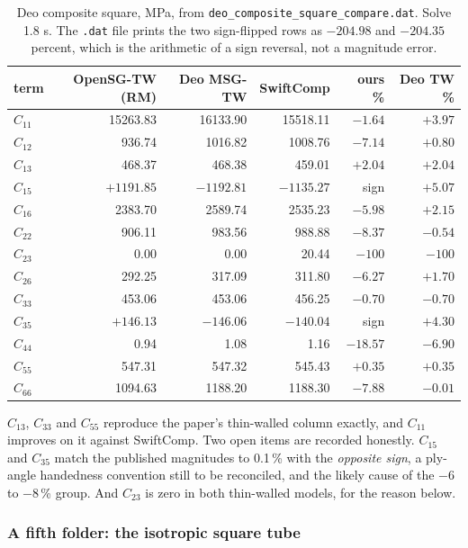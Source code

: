 \begin{table}[htbp]
\centering
\small
\begin{tabular}{lrrrrr}
\toprule
term & OpenSG-TW (RM) & Deo MSG-TW & SwiftComp & ours \% & Deo TW \% \\
\midrule
$C_{11}$ & 15263.83 & 16133.90 & 15518.11 & $-1.64$ & $+3.97$ \\
$C_{12}$ &   936.74 &  1016.82 &  1008.76 & $-7.14$ & $+0.80$ \\
$C_{13}$ &   468.37 &   468.38 &   459.01 & $+2.04$ & $+2.04$ \\
$C_{15}$ & $+1191.85$ & $-1192.81$ & $-1135.27$ & sign & $+5.07$ \\
$C_{16}$ &  2383.70 &  2589.74 &  2535.23 & $-5.98$ & $+2.15$ \\
$C_{22}$ &   906.11 &   983.56 &   988.88 & $-8.37$ & $-0.54$ \\
$C_{23}$ &     0.00 &     0.00 &    20.44 & $-100$ & $-100$ \\
$C_{26}$ &   292.25 &   317.09 &   311.80 & $-6.27$ & $+1.70$ \\
$C_{33}$ &   453.06 &   453.06 &   456.25 & $-0.70$ & $-0.70$ \\
$C_{35}$ & $+146.13$ & $-146.06$ & $-140.04$ & sign & $+4.30$ \\
$C_{44}$ &     0.94 &     1.08 &     1.16 & $-18.57$ & $-6.90$ \\
$C_{55}$ &   547.31 &   547.32 &   545.43 & $+0.35$ & $+0.35$ \\
$C_{66}$ &  1094.63 &  1188.20 &  1188.30 & $-7.88$ & $-0.01$ \\
\bottomrule
\end{tabular}
\caption{Deo composite square, MPa, from
\texttt{deo\_composite\_square\_compare.dat}. Solve 1.8 s. The \texttt{.dat} file
prints the two sign-flipped rows as $-204.98$ and $-204.35$ percent, which is the
arithmetic of a sign reversal, not a magnitude error.}
\label{tab:deo-comp}
\end{table}

$C_{13}$, $C_{33}$ and $C_{55}$ reproduce the paper's thin-walled column exactly,
and $C_{11}$ improves on it against SwiftComp. Two open items are recorded
honestly. $C_{15}$ and $C_{35}$ match the published magnitudes to 0.1\,\% with
the \emph{opposite sign}, a ply-angle handedness convention still to be
reconciled, and the likely cause of the $-6$ to $-8$\,\% group. And $C_{23}$ is
zero in both thin-walled models, for the reason below.

\subsubsection{A fifth folder: the isotropic square tube}

